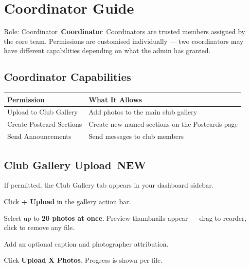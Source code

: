 \documentclass[12pt,a4paper]{article}
\newcommand{\rolebadge}[2]{%
  \colorbox{#1}{\color{white}\,\textbf{\footnotesize #2}\,}%
}
\newcommand{\newbadge}{%
  \colorbox{NewFrame}{\color{white}\,\textbf{\footnotesize NEW}\,}%
}
\begin{document}
\section{Coordinator Guide}
\label{sec:coord}

\begin{rolebox}[CoordColor]{Role: Coordinator \rolebadge{CoordColor}{Coordinator}}
Coordinators are trusted members assigned by the core team. Permissions are customised individually --- two coordinators may have different capabilities depending on what the admin has granted.
\end{rolebox}

\subsection{Coordinator Capabilities}

\begin{center}
\renewcommand{\arraystretch}{1.35}
\begin{tabularx}{\linewidth}{L{5.2cm} X}
\toprule
\textbf{Permission} & \textbf{What It Allows} \\
\midrule
Upload to Club Gallery & Add photos to the main club gallery \\
Create Postcard Sections & Create new named sections on the Postcards page \\
Send Announcements & Send messages to club members \\
\bottomrule
\end{tabularx}
\end{center}

\subsection{Club Gallery Upload \newbadge}

If permitted, the Club Gallery tab appears in your dashboard sidebar.

\begin{steps}
\item Click \textbf{+ Upload} in the gallery action bar.
\item Select up to \textbf{20 photos at once}. Preview thumbnails appear --- drag to reorder, click \texttimes{} to remove any file.
\item Add an optional caption and photographer attribution.
\item Click \textbf{Upload X Photos}. Progress is shown per file.
\end{steps}
\end{document}

